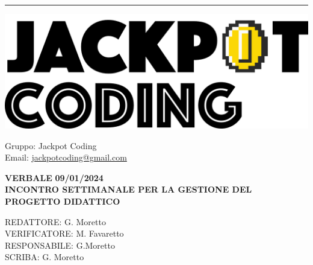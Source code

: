 \documentclass[5pt]{article}
\begin{document}
\hrule
\begin{minipage}[t]{0.50\textwidth}
    \begin{flushleft}
        \hspace{10pt}
        \includegraphics[scale=0.65]{jackpot-logo.png} 
    \end{flushleft}
\end{minipage}
\hspace{-60pt} %
\begin{flushright}
    \begin{minipage}[t]{0.50\textwidth}
        \begin{flushright}
            Gruppo: {\Large Jackpot Coding}\\
            Email: \href{mailto:jackpotcoding@gmail.com}{jackpotcoding@gmail.com}
        \end{flushright}
    \end{minipage}
\end{flushright}

\vspace{15pt}

\begin{center}
    \textbf{\large VERBALE }
    \textbf{\large 09/01/2024} \\
    \textbf{\Large INCONTRO SETTIMANALE PER LA GESTIONE DEL PROGETTO DIDATTICO}
\end{center}

\vspace{13pt}

\begin{flushleft}
    \begin{spacing}{1.5}
        REDATTORE:  G. Moretto \\
        VERIFICATORE:  M. Favaretto \\%
        RESPONSABILE: G.Moretto \\%
        \vspace{7pt}
        SCRIBA: G. Moretto\\%
    \end{spacing}
\end{flushleft}
\end{document}

